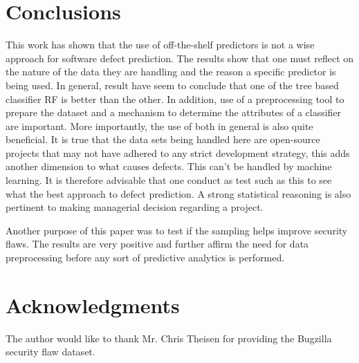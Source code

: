 \documentclass[12pt]{IEEEtran}
\begin{document}
\section{Conclusions}
\label{concl}
This work has shown that the use of off-the-shelf predictors is not a wise approach for software defect prediction. The results show that one must reflect on the nature of the data they are handling and the reason a specific predictor is being used. In general, result have seem to conclude that one of the tree based classifier RF is better than the other. In addition, use of a preprocessing tool to prepare the dataset and a mechanism to determine the attributes of a classifier are important. More importantly, the use of both in general is also quite beneficial. It is true that the data sets being handled here are open-source projects that may not have adhered to any strict development strategy, this adds another dimension to what causes defects. This can't be handled by machine learning. It is therefore advisable that one conduct as test such as this to see what the best approach to defect prediction. A strong statistical reasoning is also pertinent to making managerial decision regarding a project.

Another purpose of this paper was to test if the sampling helps improve security flaws. The results are very positive and further affirm the need for data preprocessing before any sort of predictive analytics is performed.

\section*{Acknowledgments}

The author would like to thank Mr. Chris Theisen for providing the Bugzilla security flaw dataset. 




\newpage
\appendices


\newpage
\end{document}
